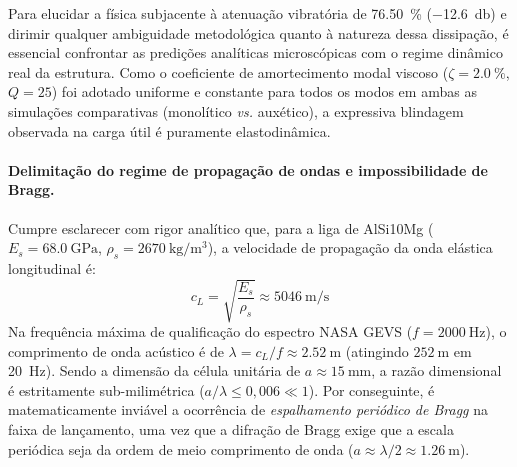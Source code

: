 Para elucidar a física subjacente à atenuação vibratória de \SI{76.50}{\percent} (\SI{-12.6}{\decibel}) e dirimir qualquer ambiguidade metodológica quanto à natureza dessa dissipação, é essencial confrontar as predições analíticas microscópicas com o regime dinâmico real da estrutura. Como o coeficiente de amortecimento modal viscoso ($\zeta = \SI{2.0}{\percent}$, $Q = 25$) foi adotado uniforme e constante para todos os modos em ambas as simulações comparativas (monolítico \textit{vs.} auxético), a expressiva blindagem observada na carga útil é puramente elastodinâmica.

\paragraph*{Delimitação do regime de propagação de ondas e impossibilidade de Bragg.}
Cumpre esclarecer com rigor analítico que, para a liga de AlSi10Mg ($E_s = \SI{68.0}{\giga\pascal}$, $\rho_s = \SI{2670}{\kilo\gram\per\cubic\metre}$), a velocidade de propagação da onda elástica longitudinal é:
\begin{equation}
  c_L = \sqrt{\frac{E_s}{\rho_s}} \approx \SI{5046}{\metre\per\second}
\end{equation}
Na frequência máxima de qualificação do espectro NASA GEVS ($f = \SI{2000}{\hertz}$), o comprimento de onda acústico é de $\lambda = c_L / f \approx \SI{2.52}{\metre}$ (atingindo $\SI{252}{\metre}$ em \SI{20}{\hertz}). Sendo a dimensão da célula unitária de $a \approx \SI{15}{\milli\metre}$, a razão dimensional é estritamente sub-milimétrica ($a / \lambda \le 0{,}006 \ll 1$). Por conseguinte, é matematicamente inviável a ocorrência de \textit{espalhamento periódico de Bragg} na faixa de lançamento, uma vez que a difração de Bragg exige que a escala periódica seja da ordem de meio comprimento de onda ($a \approx \lambda/2 \approx \SI{1.26}{\metre}$).

